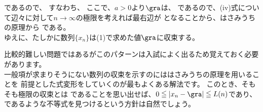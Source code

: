 \documentclass[a4paper]{ltjsarticle}
\begin{document}
\begin{enumerate}[label=\arabic*.]
\begin{enumerate}[label=(\arabic*)]
    であるので、
    すなわち、
    ここで、$a>0$より$\gra$は、
    であるので、(iv)式について辺々に対して$n\to\infty$の極限を考えれば最右辺が
    となることから、はさみうちの原理から
    である。\\
    ゆえに、たしかに数列$\{x_n\}$は(1)で求めた値$\gra$に収束する。
    \end{enumerate}

    \baselineskip
    \begin{supple*}
      比較的難しい問題ではあるがこのパターンは入試によく出るため覚えておく必要があります。 \\
      一般項が求まりそうにない数列の収束を示すのにははさみうちの原理を用いることを
      前提とした式変形をしていくのが最もよくある解法です。
      このとき、そもそも極限の収束とは
      であることを思い出せば、$0\leqq |x_n - \gra| \leqq L(n)$であり、
      であるような不等式を見つけるという方針は自然でしょう。


\end{supple*}
\end{enumerate}
\end{document}
